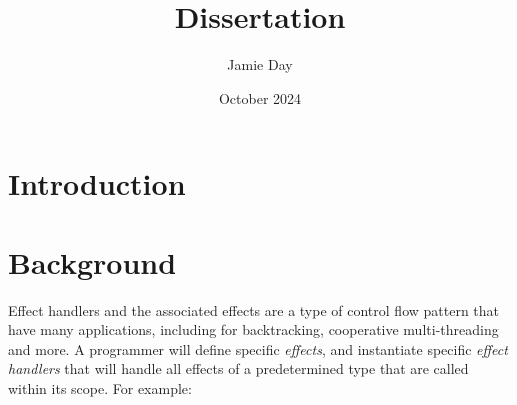 \documentclass{article}
\title{Dissertation}
\author{Jamie Day}
\date{October 2024}
\begin{document}
\maketitle
\section{Introduction}
\section{Background}

Effect handlers and the associated effects are a type of control flow pattern that have many applications, including for backtracking, cooperative multi-threading and more.\cite{effect_handlers_tutorial} A programmer will define specific \textit{effects}, and instantiate specific \textit{effect handlers} that will handle all effects of a predetermined type that are called within its scope. For example: 
\end{document}
